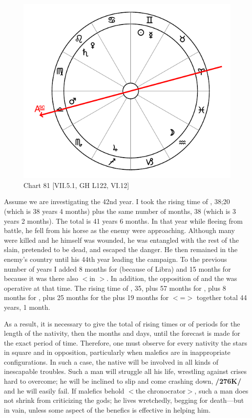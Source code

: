 \begin{figure}
\centering
\vspace{-10pt}
\includegraphics[width=.68\textwidth]{charts/7_5_1}
\caption{Chart 81 [VII.5.1, GH L122, VI.12]}
\label{fig:chart81}
\end{figure} 

Assume we are investigating the 42nd year. I took the rising time of \Libra, 38;20 (which is 38 years 4 months) plus the same number of months, 38 (which is 3 years 2 months). The total is 41 years 6 months. In that year while fleeing from battle, he fell from his horse as the enemy were approaching. Although many were killed and he himself was wounded, he was entangled with the rest of the slain, pretended to be dead, and escaped the danger. He then remained in the enemy’s country until his 44th year leading the campaign. To the previous number of years I added 8 months for \Venus\xspace (because of Libra) and 15 months for \Mars\xspace because it was there also $<$in \Libra$>$. In addition, the opposition of \Saturn\xspace and the \Moon\xspace was operative at that time. The rising time of \Leo, 35, plus 57 months for \Saturn, plus 8 months for \Venus, plus 25 months for the \Moon\xspace plus 19 months for \Leo\xspace $<$=\Sun$>$ together total 44 years, 1 month. 

As a result, it is necessary to give the total of rising times or of periods for the length of the nativity, then the months and days, until the forecast is made for the exact period of time. Therefore, one must observe for every nativity the stars in square and in opposition, particularly when malefics are in inappropriate configurations. In such a case, the native will be involved in all kinds of inescapable troubles. Such a man will struggle all his life, wrestling against crises hard to overcome; he will be inclined to slip and come crashing down, \textbf{/276K/} and he will easily fail. If malefics behold $<$the chronocrator$>$, such a man does not shrink from criticizing the gods; he lives wretchedly, begging for death—but in vain, unless some aspect of the benefics is effective in helping him. 

